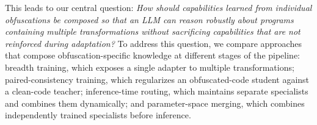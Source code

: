 


This leads to our central question:
\emph{How should capabilities learned from individual obfuscations be
composed so that an LLM can reason robustly about programs containing
multiple transformations without sacrificing capabilities that are not
reinforced during adaptation?} To address this question, we compare approaches that compose
obfuscation-specific knowledge at different stages of the pipeline:
breadth training, which exposes a single adapter to multiple transformations;
paired-consistency training, which regularizes an obfuscated-code student
against a clean-code teacher; inference-time routing, which maintains
separate specialists and combines them dynamically; and parameter-space
merging, which combines independently trained specialists before inference.

